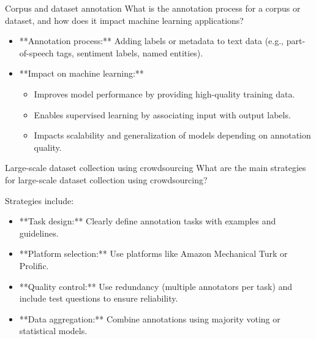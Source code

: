 \documentclass{article}
\begin{document}
\begin{exercise}{Corpus and dataset annotation}
  What is the annotation process for a corpus or dataset, and how does it impact machine learning applications?

  \begin{solution}
    \begin{itemize}
        \item **Annotation process:** Adding labels or metadata to text data (e.g., part-of-speech tags, sentiment labels, named entities).
        \item **Impact on machine learning:**
        \begin{itemize}
            \item Improves model performance by providing high-quality training data.
            \item Enables supervised learning by associating input with output labels.
            \item Impacts scalability and generalization of models depending on annotation quality.
        \end{itemize}
    \end{itemize}
  \end{solution}
\end{exercise}

\begin{exercise}{Large-scale dataset collection using crowdsourcing}
  What are the main strategies for large-scale dataset collection using crowdsourcing?

  \begin{solution}
    Strategies include:
    \begin{itemize}
        \item **Task design:** Clearly define annotation tasks with examples and guidelines.
        \item **Platform selection:** Use platforms like Amazon Mechanical Turk or Prolific.
        \item **Quality control:** Use redundancy (multiple annotators per task) and include test questions to ensure reliability.
        \item **Data aggregation:** Combine annotations using majority voting or statistical models.
    \end{itemize}
  \end{solution}
\end{exercise}



\setcounter{section}{2022}
\end{document}
